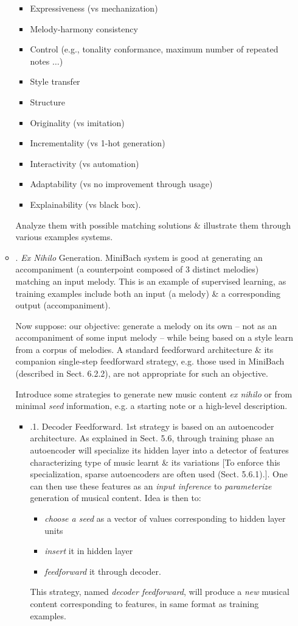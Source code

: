 \documentclass{article}
\begin{document}
\begin{itemize}
\begin{itemize}
\begin{itemize}
			\item Expressiveness (vs mechanization)
			\item Melody-harmony consistency
			\item Control (e.g., tonality conformance, maximum number of repeated notes $\ldots$)
			\item Style transfer
			\item Structure
			\item Originality (vs imitation)
			\item Incrementality (vs 1-hot generation)
			\item Interactivity (vs automation)
			\item Adaptability (vs no improvement through usage)
			\item Explainability (vs black box).
		\end{itemize}
		Analyze them with possible matching solutions \& illustrate them through various examples systems.
		\item {. {\it Ex Nihilo} Generation.} MiniBach system is good at generating an accompaniment (a counterpoint composed of 3 distinct melodies) matching an input melody. This is an example of supervised learning, as training examples include both an input (a melody) \& a corresponding output (accompaniment).

		Now suppose: our objective: generate a melody on its own -- not as an accompaniment of some input melody -- while being based on a style learn from a corpus of melodies. A standard feedforward architecture \& its companion single-step feedforward strategy, e.g. those used in MiniBach (described in Sect. 6.2.2), are not appropriate for such an objective.

		Introduce some strategies to generate new music content {\it ex nihilo} or from minimal {\it seed} information, e.g. a starting note or a high-level description.
		\begin{itemize}
			\item {.1. Decoder Feedforward.} 1st strategy is based on an autoencoder architecture. As explained in Sect. 5.6, through training phase an autoencoder will specialize its hidden layer into a detector of features characterizing type of music learnt \& its variations [To enforce this specialization, sparse autoencoders are often used (Sect. 5.6.1).]. One can then use these features as an {\it input inference} to {\it parameterize} generation of musical content. Idea is then to:
			\begin{itemize}
				\item {\it choose a seed} as a vector of values corresponding to hidden layer units
				\item {\it insert} it in hidden layer
				\item {\it feedforward} it through decoder.
			\end{itemize}
			This strategy, named {\it decoder feedforward}, will produce a {\it new} musical content corresponding to features, in same format as training examples.


\end{itemize}
\end{itemize}
\end{itemize}
\end{document}

